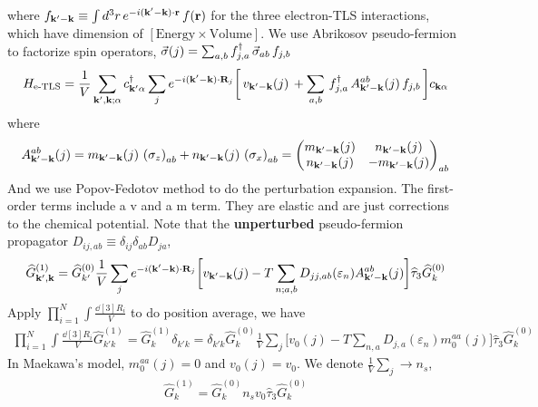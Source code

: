 \documentclass[]{article}
\begin{document}
where $f_{\vb{k}'-\vb{k}}\equiv\int d^3r\,e^{-i(\vb{k}'-\vb{k})\cdot\vb{r}}\,f(\vb{r})$ for the three electron-TLS interactions, which have dimension of $[\text{Energy}\times\text{Volume}]$.
We use Abrikosov pseudo-fermion to factorize spin operators, $\va{\sigma}(j)=\sum_{a,b}f^{\dag}_{j,a}\,\va{\sigma}_{ab}\,f_{j,b}$
\begin{eqnarray}
    \label{eq-H_electron_pseudo_fermion}
    H_{\text{e-TLS}} 
    = \frac{1}{V}
    \sum_{\vb{k}',\vb{k};\alpha}
    c^\dagger_{\vb{k}'\alpha}\sum_{j} 
    e^{-i(\vb{k}'-\vb{k})\cdot\vb{R}_j}
    \bigg[\,v_{\vb{k}'-\vb{k}}(j)\,
    + 
    \sum_{a,b}
    \,f^{\dag}_{j,a}\,A_{\vb{k}'-\vb{k}}^{ab}(j)\,f_{j,b}\,
    \bigg]c_{\vb{k}\alpha}
\end{eqnarray}
where
\begin{align}
    A_{\vb{k}'-\vb{k}}^{ab}(j)
    =
    m_{\vb{k}'-\vb{k}}(j)\,\left(\sigma_z\right)_{ab} 
    + 
    n_{\vb{k}'-\vb{k}}(j)\,\left(\sigma_x\right)_{ab}
    =\begin{pmatrix}
        m_{\vb{k}'-\vb{k}}(j) & n_{\vb{k}'-\vb{k}}(j) \\
        n_{\vb{k}'-\vb{k}}(j) & -m_{\vb{k}'-\vb{k}}(j)
    \end{pmatrix}_{ab}
\end{align}
And we use Popov-Fedotov method to do the perturbation expansion.
The first-order terms include a v and a m term.
They are elastic and are just corrections to the chemical potential.
Note that the \textbf{unperturbed} pseudo-fermion propagator $D_{ij,ab}\equiv\delta_{ij}\delta_{ab}D_{ja}$,
\begin{align}
  \widehat{G}^{(1)}_{\vb{k}',\vb{k}} = 
  \widehat{G}^{(0)}_{k'}
  \frac{1}{V}\sum_j
  e^{-i(\vb{k}'-\vb{k})\cdot\vb{R}_j}
  \bigg[
    v_{\vb{k}'-\vb{k}}(j) - T\sum_{n;a,b}D_{jj,ab}(\varepsilon_n)A^{ab}_{\vb{k}'-\vb{k}}(j)
  \bigg]\widehat{\tau}_3
  \widehat{G}^{(0)}_k
\end{align}
Apply $\prod_{i=1}^{N}\int\frac{\dd[3]{R_i}}{V}$ to do position average, we have
\begin{align}
  \prod_{i=1}^{N}\int\frac{\dd[3]{R_i}}{V}
  \widehat{G}^{(1)}_{k'k} = 
  \widehat{G}^{(1)}_{k}\delta_{k'k} = \delta_{k'k}
  \widehat{G}^{(0)}_{k}
  \frac{1}{V}\sum_j
  \bigg[
    v_0(j) - T\sum_{n,a}D_{j,a}(\varepsilon_n)m^{aa}_0(j)
  \bigg]\widehat{\tau}_3
  \widehat{G}^{(0)}_k
\end{align}
In Maekawa's model, $m^{aa}_0(j)=0$ and $v_0(j)=v_0$.
We denote $\frac{1}{V}\sum_j\rightarrow n_s$,
\begin{align}
    \widehat{G}^{(1)}_k = \widehat{G}^{(0)}_{k}n_sv_0\widehat{\tau}_3\widehat{G}_k^{(0)}
\end{align}
\end{document}
